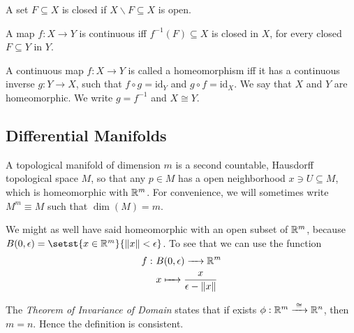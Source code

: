 \begin{definition}
	A set $F\subseteq X$ is closed if $X\backslash F \subseteq X$ is open.
\end{definition}

\begin{proposition}
	A map $f:X\to Y$ is continuous iff $f^{-1}(F) \subseteq X$ is closed in $X$, for every closed $F\subseteq Y$ in $Y$.
\end{proposition}

\begin{definition}
	A continuous map $f:X\to Y$ is called a homeomorphism iff it has a continuous inverse $g:Y\to X$, such that $f \circ g = \mathrm{id}_Y$ and $g \circ f = \mathrm{id}_X$. We say that $X$ and $Y$ are homeomorphic. We write $g=f^{-1}$ and $X \cong Y$. 
\end{definition}

\subsection{Differential Manifolds}

\begin{definition}
	A topological manifold of dimension $m$ is a second countable, Hausdorff topological space $M$, so that any $p \in M$ has a open neighborhood $x \ni U \subseteq M$, which is homeomorphic with $\mathbb R^m$. For convenience, we will sometimes write $M^m\equiv M$ such that $\dim(M)=m$.
\end{definition}

\begin{remark}
	We might as well have said homeomorphic with an open subset of $\mathbb R^m$, because $B(0,\epsilon) = \setst{x\in \bbR^m}{ \norm{x} < \epsilon }$. To see that we can use the function
	\begin{align*}
		f:~&B(0,\epsilon) \to \bbR^m \\
		& x \mapsto \frac{x}{\epsilon-\norm{x}}
	\end{align*}
\end{remark}

\begin{remark}
	The \emph{Theorem of Invariance of Domain} states that if exists $\phi:\mathbb R^m \xrightarrow{\;\cong\;} \mathbb R^n$, then $m=n$. Hence the definition is consistent.
\end{remark}

